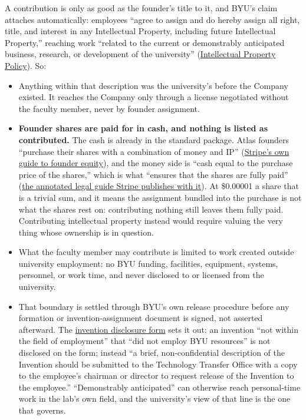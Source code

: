 \documentclass[11pt]{article}
\begin{document}
A contribution is only as good as the founder's title to it, and BYU's claim
attaches automatically: employees ``agree to assign and do hereby
assign all right, title, and interest in any Intellectual Property, including
future Intellectual Property,'' reaching work ``related to the current or
demonstrably anticipated business, research, or development of the
university''
(\href{https://policy.byu.edu/view/intellectual-property-policy}{Intellectual
Property Policy}). So:

\begin{itemize}
\item Anything within that description was the university's before the Company
existed. It reaches the Company only through a license negotiated without the
faculty member, never by founder assignment.
\item \textbf{Founder shares are paid for in cash, and nothing is listed as
contributed.} The cash is already in the standard package. Atlas founders
``purchase their shares with a combination of money and IP''
(\href{https://stripe.com/guides/atlas/equity}{Stripe's own guide to founder
equity}), and the money side is ``cash equal to the purchase price of the
shares,'' which is what ``ensures that the shares are fully paid''
(\href{https://stripe.com/files/atlas/orrick-legal-guide.pdf}{the annotated
legal guide Stripe publishes with it}). At \$0.00001 a share that is a trivial
sum, and it means the assignment bundled into the purchase is not what the
shares rest on: contributing nothing still leaves them fully paid.
Contributing intellectual property instead would require valuing the very
thing whose ownership is in question.
\item What the faculty member may contribute is limited to work created
outside university employment: no BYU funding, facilities, equipment, systems,
personnel, or work time, and never disclosed to or licensed from the
university.
\item That boundary is settled through BYU's own release procedure before any
formation or invention-assignment document is signed, not asserted afterward.
The \href{https://techtransfer.byu.edu/resources}{invention disclosure form}
sets it out: an invention ``not within the field of employment'' that ``did
not employ BYU resources'' is not disclosed on the form; instead ``a brief,
non-confidential description of the Invention should be submitted to the
Technology Transfer Office with a copy to the employee's chairman or director
to request release of the Invention to the employee.'' ``Demonstrably
anticipated'' can otherwise reach personal-time work in the lab's own field,
and the university's view of that line is the one that governs.
\end{itemize}
\end{document}
